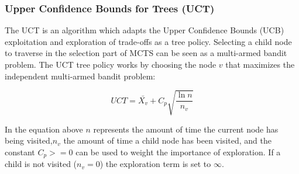 \documentclass{ba-kecs}
\begin{document}
\subsubsection{Upper Confidence Bounds for Trees (UCT)}
The UCT is an algorithm which adapts the Upper Confidence Bounds (UCB) exploitation and exploration of trade-offs as a tree policy. 
Selecting a child node to traverse in the selection part of MCTS can be seen as a multi-armed bandit problem.
The UCT tree policy works by choosing the node $v$ that maximizes the independent multi-armed bandit problem:
\begin{center}
\begin{equation}
	UCT = \bar{X_v} + C_p \sqrt{\frac{\ln n}{n_v}}
\end{equation}
\end{center}
In the equation above $n$ represents the amount of time the current node has being visited,$n_v$ the amount of time a  child node has been visited, and the constant $C_p >=0 $ can be used to weight the importance of exploration. If a child is not visited ($n_v = 0$) the exploration term is set to $\infty$.
\end{document}
